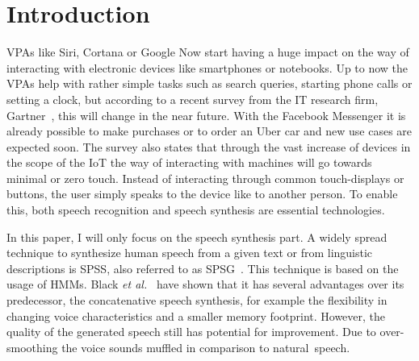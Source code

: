 

\section{Introduction}
\label{sec:introduction}

\acp{VPA} like Siri, Cortana or Google Now start having a huge impact on the way of interacting with electronic devices like smartphones or notebooks. Up to now the \acp{VPA} help with rather simple tasks such as search queries, starting phone calls or setting a clock, but according to a recent survey from the IT research firm, Gartner~\cite{gartner:assistants}, this will change in the near future. With the Facebook Messenger it is already possible to make purchases or to order an Uber car and new use cases are expected soon. The survey also states that through the vast increase of devices in the scope of the \ac{IoT} the way of interacting with machines will go towards minimal or zero touch. Instead of interacting through common touch-displays or buttons, the user simply speaks to the device like to another person. To enable this, both speech recognition and speech synthesis are essential technologies.

In this paper, I will only focus on the speech synthesis part. A widely spread technique to synthesize human speech from a given text or from linguistic descriptions is \acf{SPSS}, also referred to as \ac{SPSG}~\cite{ling:deep}. This technique is based on the usage of \acp{HMM}. Black \textit{et al.}~\cite{black:statistical} have shown that it has several advantages over its predecessor, the concatenative speech synthesis, for example the flexibility in changing voice characteristics and a smaller memory footprint. However, the quality of the generated speech still has potential for improvement. Due to over-smoothing the voice sounds muffled in comparison to natural~speech.


